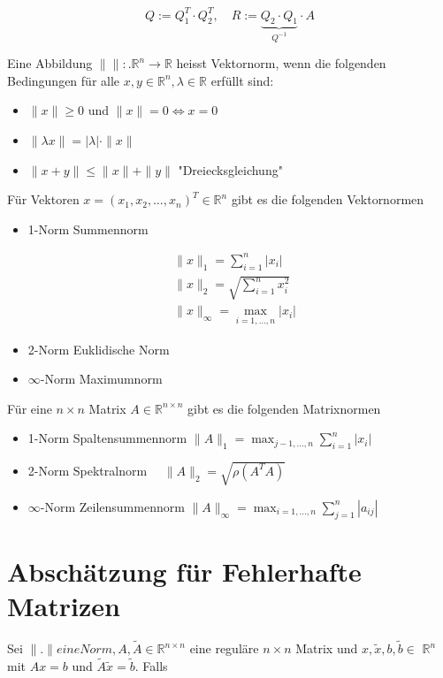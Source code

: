 \documentclass[10pt]{article}
\begin{document}
$$
Q:=Q_{1}^{T} \cdot Q_{2}^{T}, \quad R:=\underbrace{Q_{2} \cdot Q_{1}}_{Q^{-1}} \cdot A
$$

Eine Abbildung $\|\|:. \mathbb{R}^{n} \rightarrow \mathbb{R}$ heisst Vektornorm, wenn die folgenden Bedingungen für alle $x, y \in \mathbb{R}^{n}, \lambda \in \mathbb{R}$ erfüllt sind:

\begin{itemize}
  \item $\|x\| \geq 0$ und $\|x\|=0 \Leftrightarrow x=0$
  \item $\|\lambda x\|=|\lambda| \cdot\|x\|$
  \item $\|x+y\| \leq\|x\|+\|y\|$ "Dreiecksgleichung"
\end{itemize}

Für Vektoren $x=\left(x_{1}, x_{2}, \ldots, x_{n}\right)^{T} \in \mathbb{R}^{n}$ gibt es die folgenden Vektornormen

\begin{itemize}
  \item 1-Norm Summennorm
\end{itemize}

$$
\begin{aligned}
& \|x\|_{1}=\sum_{i=1}^{n}\left|x_{i}\right| \\
& \|x\|_{2}=\sqrt{\sum_{i=1}^{n} x_{i}^{2}} \\
& \|x\|_{\infty}=\max _{i=1, \ldots, n}\left|x_{i}\right|
\end{aligned}
$$

\begin{itemize}
  \item 2-Norm Euklidische Norm
  \item $\infty$-Norm Maximumnorm
\end{itemize}

Für eine $n \times n$ Matrix $A \in \mathbb{R}^{n \times n}$ gibt es die folgenden Matrixnormen

\begin{itemize}
  \item 1-Norm Spaltensummennorm $\|A\|_{1}=\max _{j-1, \ldots, n} \sum_{i=1}^{n}\left|x_{i}\right|$
  \item 2-Norm Spektralnorm $\quad\|A\|_{2}=\sqrt{\rho\left(A^{T} A\right)}$
  \item $\infty$-Norm Zeilensummennorm $\|A\|_{\infty}=\max _{i=1, \ldots, n} \sum_{j=1}^{n}\left|a_{i j}\right|$
\end{itemize}

\section*{Abschätzung für Fehlerhafte Matrizen}
Sei $\|$.$\| eine Norm, A, \tilde{A} \in \mathbb{R}^{n \times n}$ eine reguläre $n \times n$ Matrix und $x, \tilde{x}, b, \tilde{b} \in$ $\mathbb{R}^{n}$ mit $A x=b$ und $\tilde{A} \tilde{x}=\tilde{b}$. Falls
\end{document}
